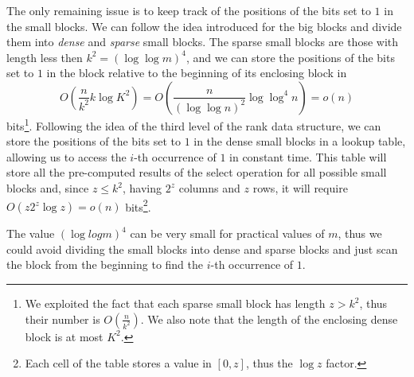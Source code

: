 \noindent The only remaining issue is to keep track of the positions of the bits set to $1$ in the small blocks. We can follow the idea introduced for the big blocks and divide them into \emph{dense} and \emph{sparse} small blocks. The sparse small blocks are those with length less then $k^2 = (\log \log m)^4$, and we can store the positions of the bits set to $1$ in the block relative to the beginning of its enclosing block in
\[
    O\left(\frac{n}{k^2} k \log K^2 \right) = O\left(\frac{n}{(\log \log n)^2} \log \log^4 n\right) = o(n)
\]
bits\footnote{
    We exploited the fact that each sparse small block has length $z > k^2$, thus their number is $O(\frac{n}{k^2})$. We also note that the length of the enclosing dense block is at most $K^2$.
}. Following the idea of the third level of the rank data structure, we can store the positions of the bits set to $1$ in the dense small blocks in a lookup table, allowing us to access the $i$-th occurrence of $1$ in constant time. This table will store all the pre-computed results of the select operation for all possible small blocks and, since $z \leq k^2$, having $2^z$ columns and $z$ rows, it will require $O(z 2^z \log z) = o(n)$ bits\footnote{
    Each cell of the table stores a value in $[0, z]$, thus the $\log z$ factor.
}.

\begin{remark}
    The value $(\log log m)^4$ can be very small for practical values of $m$, thus we could avoid dividing the small blocks into dense and sparse blocks and just scan the block from the beginning to find the $i$-th occurrence of $1$.
\end{remark}

